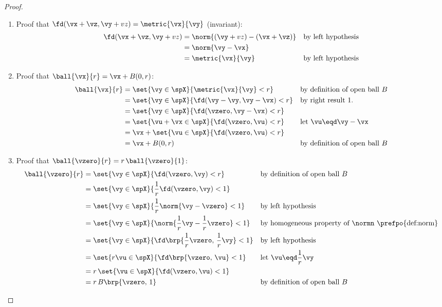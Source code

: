 \begin{proof}
\begin{enumerate}
  \item Proof that $\fd(\vx+\vz,\vy+vz) = \metric{\vx}{\vy}$ (invariant):
        \begin{align*}
          \fd(\vx+\vz,\vy+vz)
            &= \norm{(\vy+vz)-(\vx+\vz)}
            && \text{by left hypothesis}
          \\&= \norm{\vy-\vx}
          \\&= \metric{\vx}{\vy}
            && \text{by left hypothesis}
        \end{align*}

  \item Proof that $\ball{\vx}{r} = \vx + B(0,r)$:
        \begin{align*}
          \ball{\vx}{r}
            &= \set{\vy\in\spX}{\metric{\vx}{\vy}<r}
            && \text{by definition of open ball $B$}
          \\&= \set{\vy\in\spX}{\fd(\vy-\vy,\vy-\vx)<r}
            && \text{by right result 1.}
          \\&= \set{\vy\in\spX}{\fd(\vzero,\vy-\vx)<r}
          \\&= \set{\vu+\vx\in\spX}{\fd(\vzero,\vu)<r}
            && \text{let $\vu\eqd\vy-\vx$}
          \\&= \vx + \set{\vu\in\spX}{\fd(\vzero,\vu)<r}
          \\&= \vx + B(0,r)
            && \text{by definition of open ball $B$}
        \end{align*}

  \item Proof that $\ball{\vzero}{r} = r\,\ball{\vzero}{1}$:
        \begin{align*}
          \ball{\vzero}{r}
            &= \set{\vy\in\spX}{\fd(\vzero,\vy)<r}
            && \text{by definition of open ball $B$}
          \\&= \set{\vy\in\spX}{\frac{1}{r}\fd(\vzero,\vy)<1}
          \\&= \set{\vy\in\spX}{\frac{1}{r}\norm{\vy-\vzero}<1}
            && \text{by left hypothesis}
          \\&= \set{\vy\in\spX}{\norm{\frac{1}{r}\vy-\frac{1}{r}\vzero}<1}
            && \text{by homogeneous property of $\normn$ \prefpo{def:norm}}
          \\&= \set{\vy\in\spX}{\fd\brp{\frac{1}{r}\vzero,\, \frac{1}{r}\vy}<1}
            && \text{by left hypothesis}
          \\&= \set{r\vu\in\spX}{\fd\brp{\vzero,\,\vu}<1}
            && \text{let $\vu\eqd\frac{1}{r}{\vy}$}
          \\&= r\, \set{\vu\in\spX}{\fd(\vzero,\vu)<1}
          \\&= r\, B\brp{\vzero,\, 1}
            && \text{by definition of open ball $B$}
        \end{align*}


\end{enumerate}
\end{proof}
